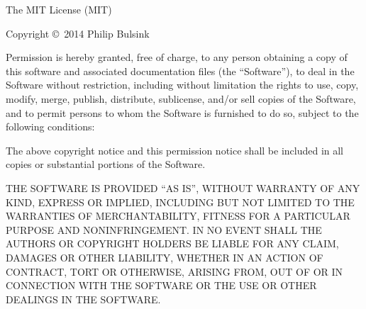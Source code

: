 The MIT License (MIT)

Copyright \copyright~2014 Philip Bulsink

Permission is hereby granted, free of charge, to any person obtaining a copy of this software and associated documentation files (the ``Software''), to deal in the Software without restriction, including without limitation the rights to use, copy, modify, merge, publish, distribute, sublicense, and/or sell copies of the Software, and to permit persons to whom the Software is furnished to do so, subject to the following conditions:

The above copyright notice and this permission notice shall be included in all copies or substantial portions of the Software.

THE SOFTWARE IS PROVIDED ``AS IS'', WITHOUT WARRANTY OF ANY KIND, EXPRESS OR IMPLIED, INCLUDING BUT NOT LIMITED TO THE WARRANTIES OF MERCHANTABILITY, FITNESS FOR A PARTICULAR PURPOSE AND NONINFRINGEMENT. IN NO EVENT SHALL THE AUTHORS OR COPYRIGHT HOLDERS BE LIABLE FOR ANY CLAIM, DAMAGES OR OTHER LIABILITY, WHETHER IN AN ACTION OF CONTRACT, TORT OR OTHERWISE, ARISING FROM, OUT OF OR IN CONNECTION WITH THE SOFTWARE OR THE USE OR OTHER DEALINGS IN THE SOFTWARE.


